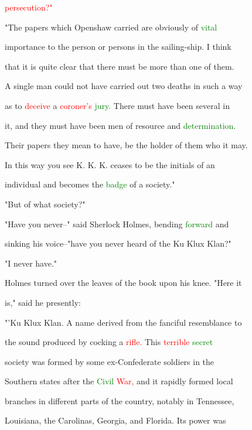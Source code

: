  \textcolor{red}{persecution?"}



 "The papers which Openshaw carried are obviously of \textcolor{green}{vital}

 \textcolor{BurntOrange}{importance} to the person or persons in the sailing-ship. I think

 that it is quite clear that there must be more than one of them.

 A single man could not have carried out two \textcolor{BurntOrange}{deaths} in such a way

 as to \textcolor{red}{deceive} a \textcolor{red}{coroner's} \textcolor{green}{jury.} There must have been several in

 it, and they must have been men of resource and \textcolor{green}{determination.}

 Their papers they mean to have, be the holder of them who it may.

 In this way you see K. K. K. ceases to be the initials of an

 individual and becomes the \textcolor{green}{badge} of a society."



 "But of what society?"



 "Have you never--" said Sherlock Holmes, bending \textcolor{green}{forward} and

 sinking his voice--"have you never heard of the Ku Klux Klan?"



 "I never have."



 Holmes turned over the leaves of the book upon his knee. "Here it

 is," said he presently:



 "'Ku Klux Klan. A name derived from the fanciful resemblance to

 the sound produced by cocking a \textcolor{red}{rifle.} This \textcolor{red}{terrible} \textcolor{green}{secret}

 society was formed by some ex-Confederate \textcolor{BurntOrange}{soldiers} in the

 Southern states after the \textcolor{green}{Civil} \textcolor{red}{War,} and it rapidly formed local

 branches in different parts of the country, notably in Tennessee,

 Louisiana, the Carolinas, Georgia, and Florida. Its power was

